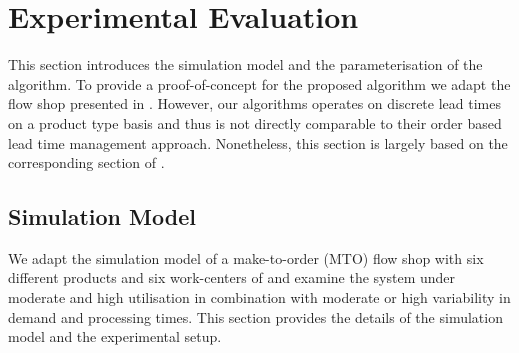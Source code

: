 \documentclass[envcountsame]{llncs}
\begin{document}
\section{Experimental Evaluation}
\label{sec:Experimental_Evaluation}


This section introduces the simulation model and the parameterisation of the algorithm. To provide a
proof-of-concept for the proposed algorithm we adapt the flow shop presented in
\citet{schneckenreither2020order}. However, our algorithms operates on discrete lead times on a
product type basis and thus is not directly comparable to their order based lead time management
approach. Nonetheless, this section is largely based on the corresponding section of
\citet{schneckenreither2020order}.

\subsection{Simulation Model}
\label{subsec:Simulation_Model}

We adapt the simulation model of a make-to-order (MTO) flow shop with six different
products and six work-centers of \citet{schneckenreither2020order} and examine the system under
moderate and high utilisation in combination with moderate or high variability in demand and
processing times. This section provides the details of the simulation model and the experimental
setup.

\end{document}
